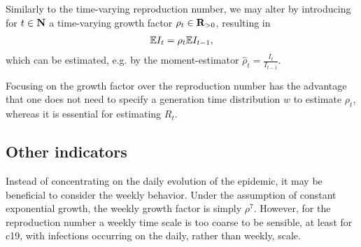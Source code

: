 Similarly to the time-varying reproduction number, we may alter  by introducing for $t \in \mathbf N$ a time-varying growth factor $\rho_{t} \in \mathbf R_{> 0}$, resulting in 
\begin{align}
    \label{eq:exponential-growth-time-varying}
    \mathbb E I_{t} = \rho_t \mathbb E I_{t - 1},
\end{align}
which can be estimated, e.g. by the moment-estimator $\hat \rho_{t} = \frac{I_{t}}{I_{t - 1}}$. 

Focusing on the growth factor over the reproduction number has the advantage that one does not need to specify a generation time distribution $w$ to estimate $\rho_{t}$, whereas it is essential for estimating $R_{t}$. 

\subsection{Other indicators}
\label{subsec:other_indicat}
Instead of concentrating on the daily evolution of the epidemic, it may be beneficial to consider the weekly behavior. Under the assumption of constant exponential growth, the weekly growth factor is simply $\rho^{7}$. However, for the reproduction number a weekly time scale is too coarse to be sensible, at least for \acrshort{c19}, with infections occurring on the daily, rather than weekly, scale.

